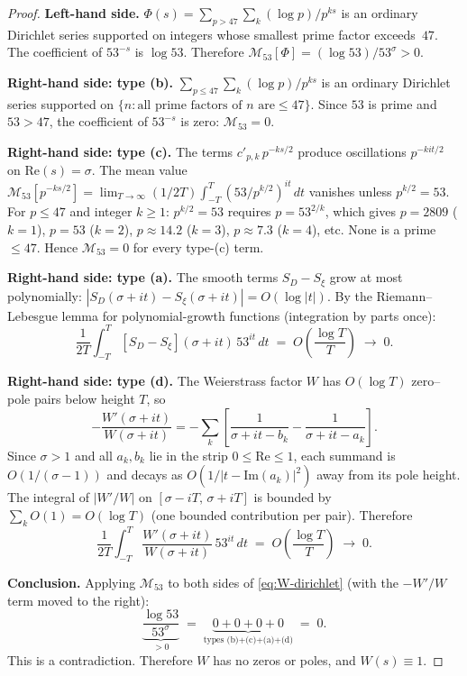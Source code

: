 \documentclass[11pt,a4paper]{article}
\theoremstyle{plain}
\theoremstyle{remark}
\begin{document}
\begin{proof}
\medskip\noindent
\textbf{Left-hand side.}\enspace
$\Phi(s) = \sum_{p>47}\sum_k (\log p)/p^{ks}$ is an ordinary
Dirichlet series supported on integers whose smallest prime factor
exceeds~$47$.  The coefficient of $53^{-s}$ is $\log 53$.  Therefore
$\mathcal{M}_{53}[\Phi] = (\log 53)/53^\sigma > 0$.

\medskip\noindent
\textbf{Right-hand side: type (b).}\enspace
$\sum_{p\leq 47}\sum_k (\log p)/p^{ks}$ is an ordinary Dirichlet
series supported on $\{n : \text{all prime factors of }n\text{ are}
\leq 47\}$.  Since $53$ is prime and $53>47$, the coefficient of
$53^{-s}$ is zero: $\mathcal{M}_{53} = 0$.

\medskip\noindent
\textbf{Right-hand side: type (c).}\enspace
The terms $c'_{p,k}\,p^{-ks/2}$ produce oscillations $p^{-kit/2}$
on $\mathrm{Re}(s)=\sigma$.  The mean value
$\mathcal{M}_{53}[p^{-ks/2}]
= \lim_{T\to\infty}(1/2T)\int_{-T}^{T}(53/p^{k/2})^{it}\,dt$
vanishes unless $p^{k/2}=53$.  For $p\leq 47$ and integer $k\geq 1$:
$p^{k/2}=53$ requires $p=53^{2/k}$, which gives
$p=2809$ ($k=1$), $p=53$ ($k=2$), $p\approx 14.2$ ($k=3$),
$p\approx 7.3$ ($k=4$), etc.  None is a prime $\leq 47$.
Hence $\mathcal{M}_{53} = 0$ for every type-(c) term.

\medskip\noindent
\textbf{Right-hand side: type (a).}\enspace
The smooth terms $S_D-S_\xi$ grow at most polynomially:
$|S_D(\sigma{+}it)-S_\xi(\sigma{+}it)| = O(\log|t|)$.
By the Riemann--Lebesgue lemma for polynomial-growth functions
(integration by parts once):
\[
  \frac{1}{2T}\int_{-T}^{T}
  [S_D-S_\xi](\sigma{+}it)\,53^{it}\,dt
  \;=\; O\!\left(\frac{\log T}{T}\right)
  \;\to\; 0.
\]

\medskip\noindent
\textbf{Right-hand side: type (d).}\enspace
The Weierstrass factor $W$ has $O(\log T)$ zero--pole pairs below
height $T$, so
\[
  -\frac{W'(\sigma{+}it)}{W(\sigma{+}it)}
  = -\sum_k\left[\frac{1}{\sigma{+}it-b_k}
    -\frac{1}{\sigma{+}it-a_k}\right].
\]
Since $\sigma>1$ and all $a_k,b_k$ lie in the strip
$0\leq\mathrm{Re}\leq 1$, each summand is $O(1/(\sigma{-}1))$ and
decays as $O(1/|t{-}\mathrm{Im}(a_k)|^2)$ away from its pole height.
The integral of $|W'/W|$ on $[\sigma{-}iT,\,\sigma{+}iT]$ is
bounded by $\sum_k O(1) = O(\log T)$ (one bounded contribution per
pair).  Therefore
\[
  \frac{1}{2T}\int_{-T}^{T}
  \frac{W'(\sigma{+}it)}{W(\sigma{+}it)}\,53^{it}\,dt
  \;=\; O\!\left(\frac{\log T}{T}\right) \;\to\; 0.
\]

\medskip\noindent
\textbf{Conclusion.}\enspace
Applying $\mathcal{M}_{53}$ to both sides of \cref{eq:W-dirichlet}
(with the $-W'/W$ term moved to the right):
\[
  \underbrace{\frac{\log 53}{53^\sigma}}_{\displaystyle>0}
  \;=\; \underbrace{0+0+0+0}_{\text{types (b)+(c)+(a)+(d)}} \;=\; 0.
\]
This is a contradiction.  Therefore $W$ has no zeros or poles, and
$W(s)\equiv 1$.
\end{proof}
\end{document}
